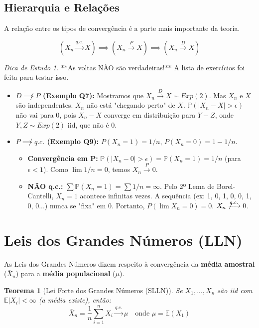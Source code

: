 \documentclass[a4paper, 10pt]{article} %
\theoremstyle{definition}
\theoremstyle{plain}
\newtheorem{theorem}{Teorema}[section]
\theoremstyle{remark}
\newtheorem*{tip}{Dica de Estudo} %
\newcommand{\E}{\mathbb{E}}
\newcommand{\Prob}{\mathbb{P}}
\newcommand{\pto}{\xrightarrow{P}}      %
\newcommand{\dto}{\xrightarrow{D}}      %
\newcommand{\qcto}{\xrightarrow{q.c.}}  %
\newcommand{\Xn}{\bar{X}_n}             %
\begin{document}
\subsection{Hierarquia e Relações}
\label{sec:hierarquia}
A relação entre os tipos de convergência é a parte mais importante da teoria.

$$ (X_n \qcto X) \implies (X_n \pto X) \implies (X_n \dto X) $$

\begin{tip}
    **As voltas NÃO são verdadeiras!** A lista de exercícios foi feita para testar isso.
    \begin{itemize}
        \item \textbf{$D \not\implies P$ (Exemplo Q7):} Mostramos que $X_n \dto X \sim Exp(2)$. Mas $X_n$ e $X$ são independentes. $X_n$ não está "chegando perto" de $X$. $\Prob(|X_n - X| > \epsilon)$ não vai para 0, pois $X_n - X$ converge em distribuição para $Y - Z$, onde $Y, Z \sim Exp(2)$ iid, que não é 0.
        \item \textbf{$P \not\implies q.c.$ (Exemplo Q9):} $P(X_n = 1) = 1/n$, $P(X_n = 0) = 1 - 1/n$.
            \begin{itemize}
                \item \textbf{Convergência em P:} $\Prob(|X_n - 0| > \epsilon) = \Prob(X_n = 1) = 1/n$ (para $\epsilon < 1$). Como $\lim 1/n = 0$, temos $X_n \pto 0$.
                \item \textbf{NÃO q.c.:} $\sum \Prob(X_n = 1) = \sum 1/n = \infty$. Pelo 2º Lema de Borel-Cantelli, $X_n=1$ acontece infinitas vezes. A sequência (ex: 1, 0, 1, 0, 0, 1, 0, 0...) nunca se "fixa" em 0. Portanto, $P(\lim X_n = 0) = 0$. $X_n \not\qcto 0$.
            \end{itemize}
    \end{itemize}
\end{tip}

\section{Leis dos Grandes Números (LLN)}
\label{sec:lln}
As Leis dos Grandes Números dizem respeito à convergência da \textbf{média amostral} ($\Xn$) para a \textbf{média populacional} ($\mu$).

\begin{theorem}[Lei Forte dos Grandes Números (SLLN)]
Se $X_1, ..., X_n$ são iid com $\E|X_i| < \infty$ (a média existe), então:
$$ \Xn = \frac{1}{n} \sum_{i=1}^n X_i \qcto \mu \quad \text{onde } \mu = \E(X_1) $$
\end{theorem}
\end{document}

